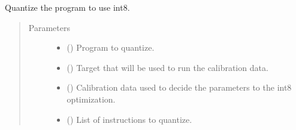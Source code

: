 \documentclass[letterpaper,10pt,english]{sphinxmanual}
\begin{document}
\begin{fulllineitems}
\label{\detokenize{reference/py:migraphx.quantize_int8}}
\sphinxAtStartPar
Quantize the program to use int8.
\begin{quote}\begin{description}
\item[{Parameters}] \leavevmode\begin{itemize}
\item {} 
\sphinxAtStartPar
{} ({\hyperref[\detokenize{reference/py:migraphx.program}]{}}) \textendash{} Program to quantize.

\item {} 
\sphinxAtStartPar
{} ({\hyperref[\detokenize{reference/py:migraphx.target}]{}}) \textendash{} Target that will be used to run the calibration data.

\item {} 
\sphinxAtStartPar
{} (\sphinxstyleliteralemphasis{\sphinxupquote{{[}}}\sphinxstyleliteralemphasis{\sphinxupquote{{[}}}\sphinxstyleliteralemphasis{\sphinxupquote{{]}}}\sphinxstyleliteralemphasis{\sphinxupquote{{]}}}) \textendash{} Calibration data used to decide the parameters to the int8 optimization.

\item {} 
\sphinxAtStartPar
{} (\sphinxstyleliteralemphasis{\sphinxupquote{{[}}}\sphinxstyleliteralemphasis{\sphinxupquote{{]}}}) \textendash{} List of instructions to quantize.

\end{itemize}

\end{description}\end{quote}

\end{fulllineitems}
\end{document}
